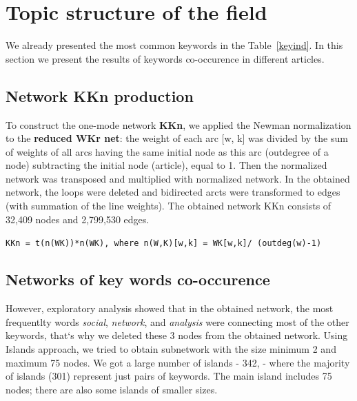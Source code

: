 \documentclass[11pt]{article} %
\begin{document}
\section{Topic structure of the field}  

We already presented the most common keywords in the  Table~\ref{keyind}. In this section we present the results of keywords co-occurence in different articles.  \medskip

\subsection{Network KKn production}

To construct the one-mode network \textbf{KKn}, we applied the Newman normalization  to the \textbf{reduced WKr net}: the weight of each arc [w, k] was divided by the sum of weights of all arcs having the same initial node as this arc (outdegree of a node) subtracting the initial node (article), equal to 1. Then the normalized network was transposed and multiplied with normalized network. In the obtained network, the loops were deleted and bidirected arcts were transformed to edges (with summation of the line weights). The obtained network KKn consists of 32,409 nodes and 2,799,530 edges. \medskip

\texttt{KKn = t(n(WK))*n(WK), where n(W,K)[w,k] = WK[w,k]/ (outdeg(w)-1)} \medskip

\subsection{Networks of key words co-occurence}

However, exploratory analysis showed that in the obtained network, the most frequentlty words \textit{social}, \textit{network}, and \textit{analysis} were connecting most of the other keywords, that`s why we deleted these 3 nodes from the obtained network. Using Islands approach, we tried to obtain subnetwork with the size minimum 2 and maximum 75 nodes. We got a large number of islands - 342, - where the majority of islands (301) represent just pairs of keywords. The main island includes 75 nodes; there are also some islands of smaller sizes. 



\end{document}
